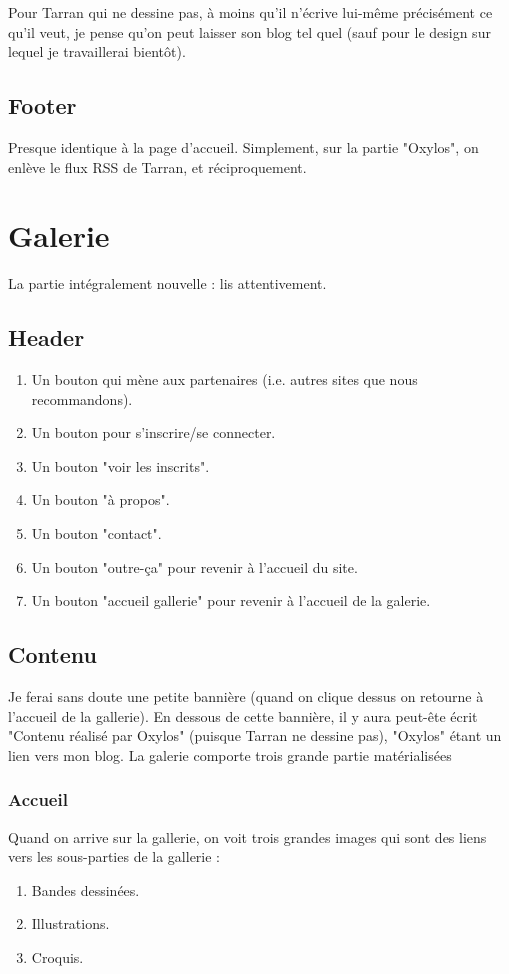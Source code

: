 \documentclass[french]{report}
\theoremstyle{plain}
\begin{document}
			Pour Tarran qui ne dessine pas, à moins qu'il n'écrive lui-même précisément ce qu'il veut, je pense qu'on peut laisser son blog tel quel (sauf pour le design sur lequel je travaillerai bientôt).

		\section{Footer}
			Presque identique à la page d'accueil. Simplement, sur la partie "Oxylos", on enlève le flux RSS de Tarran, et réciproquement.


\chapter{Galerie} \label{galerie} 
	La partie intégralement nouvelle : lis attentivement.
	\section{Header}
		\begin{enumerate}
			\item Un bouton qui mène aux partenaires (i.e. autres sites que nous recommandons).
			\item Un bouton pour s'inscrire/se connecter.
			\item Un bouton "voir les inscrits".			
			\item Un bouton "à propos".
			\item Un bouton "contact".
			\item Un bouton "outre-ça" pour revenir à l'accueil du site.
			\item Un bouton "accueil gallerie" pour revenir à l'accueil de la galerie.
		\end{enumerate}

	\section{Contenu}
		Je ferai sans doute une petite bannière (quand on clique dessus on retourne à l'accueil de la gallerie). En dessous de cette bannière, il y aura peut-ête écrit "Contenu réalisé par Oxylos" (puisque Tarran ne dessine pas), "Oxylos" étant un lien vers mon blog. La galerie comporte trois grande partie matérialisées 

		\subsection{Accueil}
			Quand on arrive sur la gallerie, on voit trois grandes images qui sont des liens vers les sous-parties de la gallerie :
			\begin{enumerate}
				\item Bandes dessinées.
				\item Illustrations.
				\item Croquis. 
			\end{enumerate}
\end{document}

